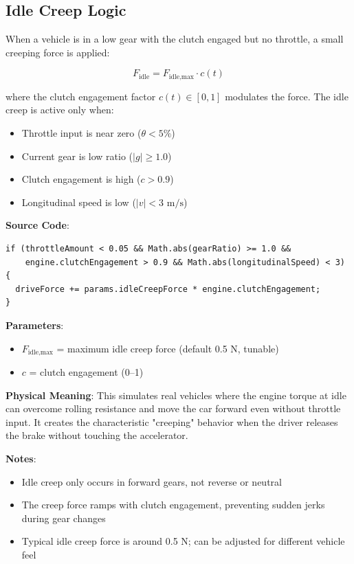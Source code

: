 \subsection{Idle Creep Logic}

When a vehicle is in a low gear with the clutch engaged but no throttle, a small creeping force is applied:

\begin{equation}
  F_{\text{idle}} = F_{\text{idle,max}} \cdot c(t)
  \label{eq:idle-creep}
\end{equation}

where the clutch engagement factor $c(t) \in [0, 1]$ modulates the force. The idle creep is active only when:
\begin{itemize}
  \item Throttle input is near zero ($\theta < 5\%$)
  \item Current gear is low ratio ($|g| \ge 1.0$)
  \item Clutch engagement is high ($c > 0.9$)
  \item Longitudinal speed is low ($|v| < 3 \text{ m/s}$)
\end{itemize}

\textbf{Source Code}: 

\begin{lstlisting}[caption={Idle creep force application}]
if (throttleAmount < 0.05 && Math.abs(gearRatio) >= 1.0 &&
    engine.clutchEngagement > 0.9 && Math.abs(longitudinalSpeed) < 3) {
  driveForce += params.idleCreepForce * engine.clutchEngagement;
}
\end{lstlisting}

\textbf{Parameters}:
\begin{itemize}
  \item $F_{\text{idle,max}}$ = maximum idle creep force (default 0.5 N, tunable)
  \item $c$ = clutch engagement (0–1)
\end{itemize}

\textbf{Physical Meaning}: This simulates real vehicles where the engine torque at idle can overcome rolling resistance and move the car forward even without throttle input. It creates the characteristic "creeping" behavior when the driver releases the brake without touching the accelerator.

\textbf{Notes}:
\begin{itemize}
  \item Idle creep only occurs in forward gears, not reverse or neutral
  \item The creep force ramps with clutch engagement, preventing sudden jerks during gear changes
  \item Typical idle creep force is around 0.5 N; can be adjusted for different vehicle feel
\end{itemize}

